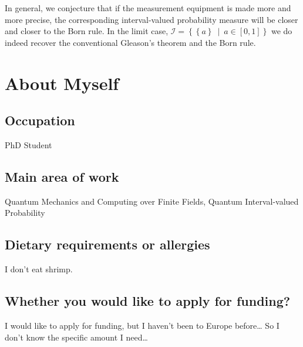 \documentclass{article}
\theoremstyle{remark}
\begin{document}
In general, we conjecture that if the measurement equipment is made
more and more precise, the corresponding interval-valued probability
measure will be closer and closer to the Born rule. In the limit case,
$\mathscr{I}=\left\{ \left\{ a\right\} ~\middle|~a\in\left[0,1\right]\right\} $
we do indeed recover the conventional Gleason's theorem and the Born
rule.

\section{About Myself}

\subsection{Occupation }

PhD Student

\subsection{Main area of work}

Quantum Mechanics and Computing over Finite Fields, Quantum Interval-valued
Probability

\subsection{Dietary requirements or allergies}

I don’t eat shrimp.

\subsection{Whether you would like to apply for funding?}

I would like to apply for funding, but I haven’t been to Europe before…
So I don't know the specific amount I need…

\printbibliography 
\end{document}
